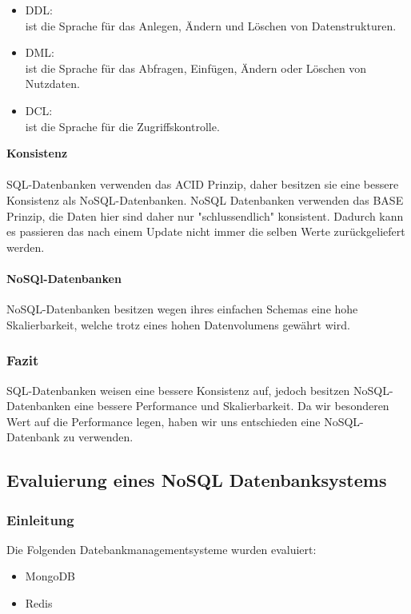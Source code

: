 \documentclass[11pt]{article}
\begin{document}
\begin{itemize}
	\item DDL:\\ ist die Sprache f\"ur das Anlegen, \"Andern und L\"oschen von Datenstrukturen.
	\item DML:\\ ist die Sprache f\"ur das Abfragen, Einf\"ugen, \"Andern oder L\"oschen von Nutzdaten.
	\item DCL:\\ ist die Sprache f\"ur die Zugriffskontrolle.
\end{itemize}
\textbf{Konsistenz}\\\\
SQL-Datenbanken verwenden das ACID Prinzip, daher besitzen sie eine bessere Konsistenz als
NoSQL-Datenbanken. NoSQL Datenbanken verwenden das BASE Prinzip, die Daten hier sind daher
nur "schlussendlich" konsistent. Dadurch kann es passieren das nach einem Update nicht immer
die selben Werte zur\"uckgeliefert werden.

\paragraph{NoSQl-Datenbanken}
NoSQL-Datenbanken besitzen wegen ihres einfachen Schemas eine hohe Skalierbarkeit, welche trotz eines
hohen Datenvolumens gew\"ahrt wird.

\subsubsection{Fazit}
SQL-Datenbanken weisen eine bessere Konsistenz auf, jedoch besitzen NoSQL-Datenbanken
eine bessere Performance und Skalierbarkeit. Da wir besonderen Wert auf die Performance
legen, haben wir uns entschieden eine NoSQL-Datenbank zu verwenden.

\subsection{Evaluierung eines NoSQL Datenbanksystems}

\subsubsection{Einleitung}
Die Folgenden Datebankmanagementsysteme wurden evaluiert:

\begin{itemize}
	\item MongoDB
	\item Redis
\end{itemize}
\end{document}
